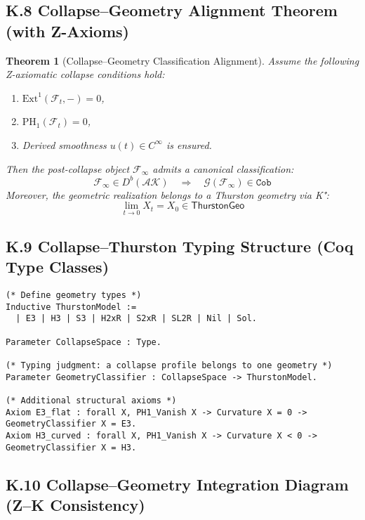 \documentclass[11pt]{article}
\newtheorem{theorem}{Theorem}[section]
\begin{document}
\begin{axiom}
\begin{axiom}
\subsection*{K.8 Collapse–Geometry Alignment Theorem (with Z-Axioms)}

\begin{theorem}[Collapse–Geometry Classification Alignment]
Assume the following Z-axiomatic collapse conditions hold:
\begin{enumerate}
  \item[(Z.2)] \( \mathrm{Ext}^1(\mathcal{F}_t, -) = 0 \),
  \item[(Z.3)] \( \mathrm{PH}_1(\mathcal{F}_t) = 0 \),
  \item[(Z.6)] Derived smoothness \( u(t) \in C^\infty \) is ensured.
\end{enumerate}
Then the post-collapse object \( \mathcal{F}_\infty \) admits a canonical classification:
\[
\mathcal{F}_\infty \in D^b(\mathcal{AK}) \quad \Rightarrow \quad \mathcal{G}(\mathcal{F}_\infty) \in \texttt{Cob}
\]
Moreover, the geometric realization belongs to a Thurston geometry via K⁺:
\[
\lim_{t \to 0} X_t = X_0 \in \mathsf{ThurstonGeo}
\]
\end{theorem}

\subsection*{K.9 Collapse–Thurston Typing Structure (Coq Type Classes)}

\begin{lstlisting}[language=Coq]
(* Define geometry types *)
Inductive ThurstonModel :=
  | E3 | H3 | S3 | H2xR | S2xR | SL2R | Nil | Sol.

Parameter CollapseSpace : Type.

(* Typing judgment: a collapse profile belongs to one geometry *)
Parameter GeometryClassifier : CollapseSpace -> ThurstonModel.

(* Additional structural axioms *)
Axiom E3_flat : forall X, PH1_Vanish X -> Curvature X = 0 -> GeometryClassifier X = E3.
Axiom H3_curved : forall X, PH1_Vanish X -> Curvature X < 0 -> GeometryClassifier X = H3.
\end{lstlisting}

\subsection*{K.10 Collapse–Geometry Integration Diagram (Z–K Consistency)}


\end{axiom}
\end{axiom}
\end{document}
